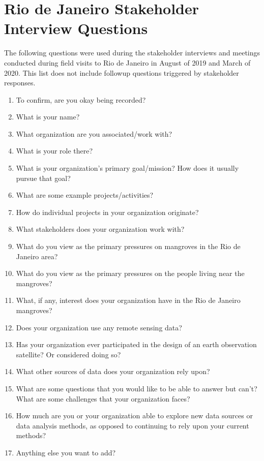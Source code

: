 \chapter{Rio de Janeiro Stakeholder Interview Questions} \label{interview-questions}

The following questions were used during the stakeholder interviews and meetings conducted during field visits to Rio de Janeiro in August of 2019 and March of 2020. This list does not include followup questions triggered by stakeholder responses.

\begin{enumerate}\setlength{\itemsep}{0pt}\setlength{\parskip}{0pt}
    \item{To confirm, are you okay being recorded?}
    \item{What is your name?}
    \item{What organization are you associated/work with?}
    \item{What is your role there?}
    \item{What is your organization's primary goal/mission? How does it usually pursue that goal?}
    \item{What are some example projects/activities?}
    \item{How do individual projects in your organization originate?}
    \item{What stakeholders does your organization work with?}
    \item{What do you view as the primary pressures on mangroves in the Rio de Janeiro area?}
    \item{What do you view as the primary pressures on the people living near the mangroves?}
    \item{What, if any, interest does your organization have in the Rio de Janeiro mangroves?}
    \item{Does your organization use any remote sensing data?}
    \item{Has your organization ever participated in the design of an earth observation satellite? Or considered doing so?}
    \item{What other sources of data does your organization rely upon?}
    \item{What are some questions that you would like to be able to answer but can't? What are some challenges that your organization faces?}
    \item{How much are you or your organization able to explore new data sources or data analysis methods, as opposed to continuing to rely upon your current methods?}
    \item{Anything else you want to add?}
\end{enumerate}